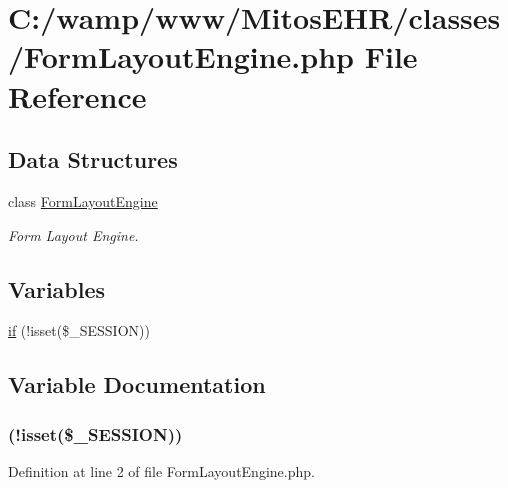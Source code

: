 \hypertarget{_form_layout_engine_8php}{\section{\-C\-:/wamp/www/\-Mitos\-E\-H\-R/classes/\-Form\-Layout\-Engine.php \-File \-Reference}
\label{_form_layout_engine_8php}
}
\subsection*{\-Data \-Structures}
\begin{DoxyCompactItemize}
\item 
class \hyperlink{class_form_layout_engine}{\-Form\-Layout\-Engine}
\begin{DoxyCompactList}\small\item\em \-Form \-Layout \-Engine. \end{DoxyCompactList}\end{DoxyCompactItemize}
\subsection*{\-Variables}
\begin{DoxyCompactItemize}
\item 
\hyperlink{_form_layout_engine_8php_a8ceca98aa29914fd2479a84a8d2242fb}{if} (!isset(\$\-\_\-\-S\-E\-S\-S\-I\-O\-N))
\end{DoxyCompactItemize}


\subsection{\-Variable \-Documentation}
\hypertarget{_form_layout_engine_8php_a8ceca98aa29914fd2479a84a8d2242fb}{
\subsubsection[{if}]{(!isset(\$\-\_\-\-S\-E\-S\-S\-I\-O\-N))}}\label{_form_layout_engine_8php_a8ceca98aa29914fd2479a84a8d2242fb}


\-Definition at line 2 of file \-Form\-Layout\-Engine.\-php.

